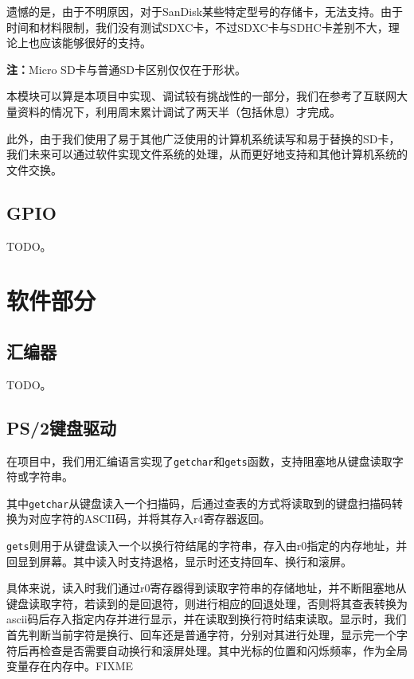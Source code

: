 \documentclass[11pt,utf8]{report}
\begin{document}
	\par 遗憾的是，由于不明原因，对于SanDisk某些特定型号的存储卡，无法支持。由于时间和材料限制，我们没有测试SDXC卡，不过SDXC卡与SDHC卡差别不大，理论上也应该能够很好的支持。
	
	\par \textbf{注：}Micro SD卡与普通SD卡区别仅仅在于形状。
	
	\par 本模块可以算是本项目中实现、调试较有挑战性的一部分，我们在参考了互联网大量资料的情况下，利用周末累计调试了两天半（包括休息）才完成。
	\par 此外，由于我们使用了易于其他广泛使用的计算机系统读写和易于替换的SD卡，我们未来可以通过软件实现文件系统的处理，从而更好地支持和其他计算机系统的文件交换。
	
\subsection{GPIO}
	\par TODO。

\section{软件部分}

\subsection{汇编器}
	\par TODO。

\subsection{PS/2键盘驱动}
	在项目中，我们用汇编语言实现了\texttt{getchar}和\texttt{gets}函数，支持阻塞地从键盘读取字符或字符串。

	其中\texttt{getchar}从键盘读入一个扫描码，后通过查表的方式将读取到的键盘扫描码转换为对应字符的ASCII码，并将其存入r4寄存器返回。

	\texttt{gets}则用于从键盘读入一个以换行符结尾的字符串，存入由r0指定的内存地址，并回显到屏幕。其中读入时支持退格，显示时还支持回车、换行和滚屏。

	具体来说，读入时我们通过r0寄存器得到读取字符串的存储地址，并不断阻塞地从键盘读取字符，若读到的是回退符，则进行相应的回退处理，否则将其查表转换为ascii码后存入指定内存并进行显示，并在读取到换行符时结束读取。显示时，我们首先判断当前字符是换行、回车还是普通字符，分别对其进行处理，显示完一个字符后再检查是否需要自动换行和滚屏处理。其中光标的位置和闪烁频率，作为全局变量存在内存中。FIXME
\end{document}
